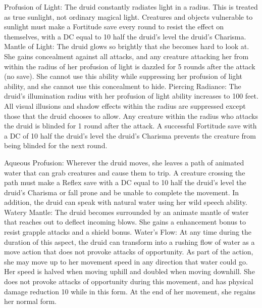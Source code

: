 \begin{greaterwildaspect}
\wilditem Profusion of Light: The druid constantly radiates light in a \arealarge radius. This is treated as true sunlight, not ordinary magical light. Creatures and objects vulnerable to sunlight must make a Fortitude save every round to resist the effect on themselves, with a DC equal to 10 \add half the druid's level \add the druid's Charisma.
\wilditem Mantle of Light: The druid glows so brightly that she becomes hard to look at. She gains concealment against all attacks, and any creature attacking her from within the radius of her profusion of light is dazzled for 5 rounds after the attack (no save). She cannot use this ability while suppressing her profusion of light ability, and she cannot use this concealment to hide.
\wilditemplus Piercing Radiance: The druid's illumination radius with her profusion of light ability increases to 100 feet. All visual illusions and shadow effects within the radius are suppressed except those that the druid chooses to allow. Any creature within the radius who attacks the druid is blinded for 1 round after the attack. A successful Fortitude save with a DC of 10 \add half the druid's level \add the druid's Charisma prevents the creature from being blinded for the next round.
\end{greaterwildaspect}

\begin{greaterwildaspect}
\wilditem Aqueous Profusion: Wherever the druid moves, she leaves a path of animated water that can grab creatures and cause them to trip. A creature crossing the path must make a Reflex save with a DC equal to 10 \add half the druid's level \add the druid's Charisma or fall prone and be unable to complete the movement. In addition, the druid can speak with natural water using her wild speech ability.
\wilditem Watery Mantle: The druid becomes surrounded by an animate mantle of water that reaches out to deflect incoming blows. She gains a  enhancement bonus to resist grapple attacks and a  shield bonus.
\wilditemplus Water's Flow: At any time during the duration of this aspect, the druid can transform into a rushing flow of water as a move action that does not provoke attacks of opportunity. As part of the action, she may move up to her movement speed in any direction that water could go. Her speed is halved when moving uphill and doubled when moving downhill. She does not provoke attacks of opportunity during this movement, and has physical damage reduction 10 while in this form. At the end of her movement, she regains her normal form.
\end{greaterwildaspect}

